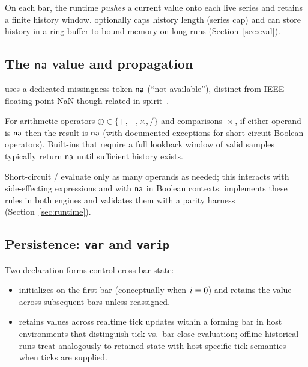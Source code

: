 \documentclass[11pt,a4paper]{article}
\begin{document}
On each bar, the runtime \emph{pushes} a current value onto each live series
and retains a finite history window.
\pyne{} optionally caps history length (series cap) and can store history in a
ring buffer to bound memory on long runs (Section~\ref{sec:eval}).

\subsection{The $\mathsf{na}$ value and propagation}
\label{sec:na}

\pine{} uses a dedicated missingness token $\textsf{na}$ (``not available''), distinct
from IEEE floating-point NaN though related in spirit~\citep{ieee754,higham2002accuracy}.

\begin{definition}
\label{def:na}
For arithmetic operators $\oplus \in \{+,-,\times,/\}$ and comparisons
$\bowtie$, if either operand is $\textsf{na}$ then the result is $\textsf{na}$
(with documented exceptions for short-circuit Boolean operators).
Built-ins that require a full lookback window of valid samples typically
return $\textsf{na}$ until sufficient history exists.
\end{definition}

Short-circuit / evaluate only as many operands as needed;
this interacts with side-effecting expressions and with $\textsf{na}$ in Boolean
contexts. \pyne{} implements these rules in both engines and validates them
with a parity harness (Section~\ref{sec:runtime}).

\subsection{Persistence: \texttt{var} and \texttt{varip}}
\label{sec:var}

Two declaration forms control cross-bar state:

\begin{itemize}[leftmargin=1.2em]
  \item {} initializes on the first bar (conceptually when
    $i = 0$) and retains the value across subsequent bars unless
    reassigned.
  \item {} retains values across realtime tick updates within a
    forming bar in host environments that distinguish tick vs.\ bar-close
    evaluation; offline historical runs treat  analogously to
    retained state with host-specific tick semantics when ticks are supplied.
\end{itemize}
\end{document}
